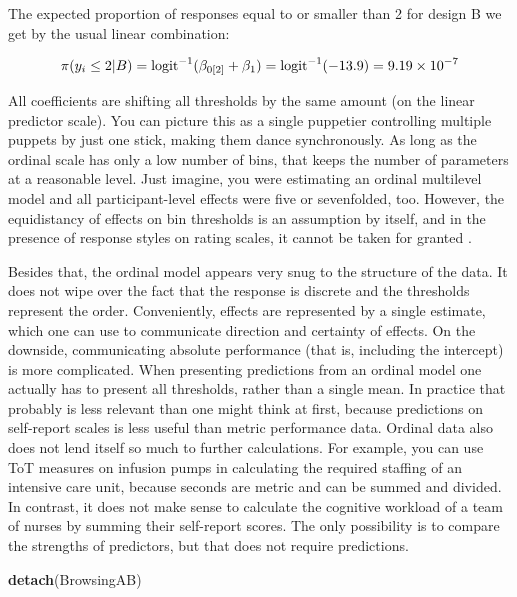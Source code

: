\documentclass[]{svmono}
\newenvironment{Shaded}{\begin{snugshade}}{\end{snugshade}}
\newcommand{\KeywordTok}[1]{\textcolor[rgb]{0.13,0.29,0.53}{\textbf{#1}}}
\newcommand{\NormalTok}[1]{#1}
\begin{document}
The expected proportion of responses equal to or smaller than 2 for
design B we get by the usual linear combination:

\[
\pi(y_i \leq 2|B) = \\
\text{logit}^{-1}(\beta_{0[2]} + \beta_1) = \\ 
\text{logit}^{-1}(-13.9) = \\
9.19\times 10^{-7}
\]

All coefficients are shifting all thresholds by the same amount (on the
linear predictor scale). You can picture this as a single puppetier
controlling multiple puppets by just one stick, making them dance
synchronously. As long as the ordinal scale has only a low number of
bins, that keeps the number of parameters at a reasonable level. Just
imagine, you were estimating an ordinal multilevel model and all
participant-level effects were five or sevenfolded, too. However, the
equidistancy of effects on bin thresholds is an assumption by itself,
and in the presence of response styles on rating scales, it cannot be
taken for granted .

Besides that, the ordinal model appears very snug to the structure of
the data. It does not wipe over the fact that the response is discrete
and the thresholds represent the order. Conveniently, effects are
represented by a single estimate, which one can use to communicate
direction and certainty of effects. On the downside, communicating
absolute performance (that is, including the intercept) is more
complicated. When presenting predictions from an ordinal model one
actually has to present all thresholds, rather than a single mean. In
practice that probably is less relevant than one might think at first,
because predictions on self-report scales is less useful than metric
performance data. Ordinal data also does not lend itself so much to
further calculations. For example, you can use ToT measures on infusion
pumps in calculating the required staffing of an intensive care unit,
because seconds are metric and can be summed and divided. In contrast,
it does not make sense to calculate the cognitive workload of a team of
nurses by summing their self-report scores. The only possibility is to
compare the strengths of predictors, but that does not require
predictions.

\begin{Shaded}
\begin{Highlighting}[]
\KeywordTok{detach}\NormalTok{(BrowsingAB)}
\end{Highlighting}
\end{Shaded}
\end{document}
